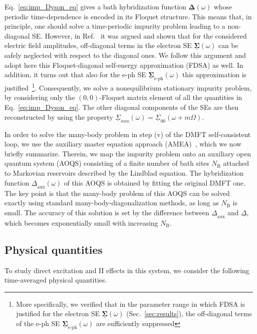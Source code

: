 \documentclass[aps,prb,groupedaddress,showpacs,twocolumn,superscriptaddress,10pt]{revtex4-2}
\newcommand{\mat}[1]{\bm{#1}} %
\newcommand{\kel}[1]{\underline{#1}} %
\begin{document}
Eq.~\eqref{eq:imp_Dyson_eq} gives a bath hybridization function $\kel{\mat\Delta}(\omega)$ whose periodic time-dependence is encoded in its Floquet structure. This means that, in principle, one should solve a time-periodic impurity problem leading to a non-diagonal SE. However, in Ref.~\cite{so.do.18} it was argued and shown that for the considered electric field amplitudes, off-diagonal terms in the electron SE $\kel{\mat{\Sigma}}(\omega)$ can be safely neglected with respect to the diagonal ones. We follow this argument and adopt here this Floquet-diagonal self-energy approximation (FDSA) as well. In addition, it turns out that also for the e-ph SE $\kel{\mat{\Sigma}}_{\text{e-ph}}(\omega)$ this approximation is justified~\footnote{More specifically, we verified that in the parameter range in which FDSA is justified for the electron SE $\kel{\mat{\Sigma}}(\omega)$ (Sec.~\ref{sec:results}), the off-diagonal terms of the e-ph SE $\kel{\mat{\Sigma}}_{\text{e-ph}}(\omega)$ are sufficiently suppressed}. Consequently, we solve a nonequilibrium stationary impurity problem, by considering only the $(0,0)$-Floquet matrix element of all the quantities in Eq.~\eqref{eq:imp_Dyson_eq}. The other diagonal components of the SEs are then reconstructed by using the property $\kel{\Sigma}_{mm}(\omega) = \kel{\Sigma}_{00}(\omega+m\Omega)$. 

In order to solve the many-body problem in step (v) of the DMFT self-consistent loop, we use the auxiliary master equation approach (AMEA)~\cite{ar.kn.13,do.nu.14,do.ga.15,do.so.17}, which we now briefly summarize. Therein, we map the impurity problem onto an auxiliary open quantum system (AOQS) consisting of a finite number of bath sites $N_{\text{B}}$ attached to Markovian reservoirs described by the Lindblad equation. The  hybridization function $\kel{\Delta}_{\text{aux}}(\omega)$ of this AOQS is obtained by fitting the original DMFT one. The key point is that the many-body problem of this AOQS can be solved exactly using standard many-body-diagonalization methods, as long as  $N_{\text{B}}$ is small. The accuracy of this solution is set by the difference between $\kel{\Delta}_{\text{aux}}$ and $\kel{\Delta}$, which  becomes exponentially small with increasing $N_{\text{B}}$.

\subsection{Physical quantities}
\label{sec:observables}  

To study direct excitation and II effects in this system, we consider the following time-averaged physical quantities.
\end{document}
